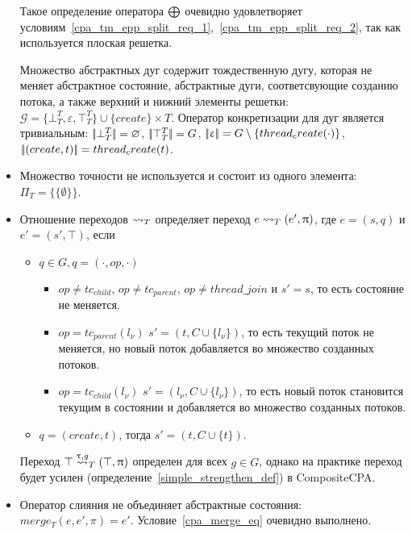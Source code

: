 \begin{itemize}
Такое определение оператора $\mathrel{\bigoplus}$ очевидно удовлетворяет условиям~\ref{cpa_tm_epp_split_req_1},~\ref{cpa_tm_epp_split_req_2}, так как используется плоская решетка.

Множество абстрактных дуг содержит тождественную дугу, которая не меняет абстрактное состояние, абстрактные дуги, соответсвующие созданию потока, а также верхний и нижний элементы решетки: $\mathcal{G} = \{\bot^T_T, \varepsilon, \top^T_T\} \cup \{create\} \times T$.
Оператор конкретизации для дуг является тривиальным: $\lvert \! \lvert \bot^T_T \rvert \! \rvert = \varnothing$,  $\lvert \! \lvert \top^T_T \rvert \! \rvert = G $, $\lvert \! \lvert \upvarepsilon \rvert \! \rvert =G \setminus \{thread_create(\cdot)\}$, $\lvert \! \lvert (create,t) \rvert \! \rvert = thread_create(t)$.

\item Множество точности не используется и состоит из одного элемента: $\Pi_T = \{\{\emptyset\}\}$.

\item Отношение переходов $\leadsto_T$ определяет переход $e \leadsto_T (e', \uppi)$, где $e=(s,q)$ и $e' = (s', \top)$, если 
\begin{itemize}
\item $q \in G, q =(\cdot, op, \cdot)$
\begin{itemize}
\item $op \neq tc_{child}$, $op \neq tc_{parent}$, $op \neq thread\_join$  и $s' = s$, то есть состояние не меняется.
\item $op = tc_{parent}(l_\nu)$ $s' = (t, C \cup \{l_\nu\})$, то есть текущий поток не меняется, но новый поток добавляется во множество созданных потоков.
\item $op = tc_{child}(l_\nu)$ $s' = (l_\nu, C \cup \{l_\nu\})$, то есть новый поток становится текущим в состоянии и добавляется во множество созданных потоков.
\end{itemize}
\item $q=(create, t)$, тогда $s' = (t,  C \cup \{t\})$.
\end{itemize}

Переход $\top \stackrel{\uptau, g}{\leadsto}_T (\top, \uppi)$ определен для всех $g\in G$, однако на практике переход будет усилен (определение~\ref{simple_strengthen_def}) в CompositeCPA.

\item Оператор слияния не объединяет абстрактные состояния: $merge_T(e, e', \pi) = e'$. Условие~\ref{cpa_merge_eq} очевидно выполнено.


\end{itemize}
